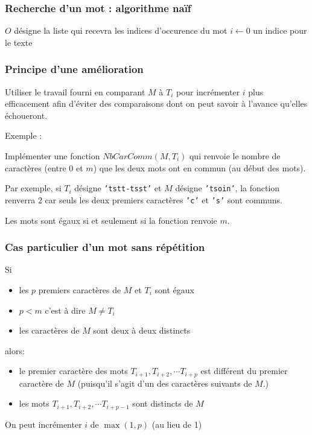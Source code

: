 \begin{frame}
\frametitle{Recherche d'un mot : algorithme naïf}
\begin{algorithm}[H]
  $O$ désigne la liste qui recevra les indices d'occurence du mot\;
  $i\leftarrow 0$ un indice pour le texte \;
  \caption{}
\end{algorithm}
\end{frame}

\begin{frame}
  \frametitle{Principe d'une amélioration}
\begin{center}
  \item Utiliser le travail fourni en comparant $M$ à $T_i$ pour incrémenter $i$ plus efficacement afin d'éviter des comparaisons dont on peut savoir à l'avance qu'elles échoueront. 
\end{center}

Exemple :

Implémenter une fonction $NbCarComm(M,T_i)$ qui renvoie le nombre de caractères (entre 0 et $m$) que les deux mots ont en commun (au début des mots).

Par exemple, si $T_i$ désigne \texttt{'tstt-tsst'} et $M$ désigne \texttt{'tsoin'}, la fonction renverra $2$ car seuls les deux premiers caractères \texttt{'c'} et \texttt{'s'} sont communs.

Les mots sont égaux si et seulement si la fonction renvoie $m$.
\end{frame}

\begin{frame}
  \frametitle{Cas particulier d'un mot sans répétition}
Si
\begin{itemize}
  \item les $p$ premiers caractères de $M$ et $T_i$ sont égaux
  \item $p<m$ c'est à dire $M\neq T_i$
  \item les caractères de $M$ sont deux à deux distincts
\end{itemize}
alors:
\begin{itemize}
  \item le premier caractère des mots $T_{i+1}, T_{i+2},\cdots T_{i+p}$ est différent du premier caractère de $M$ (puisqu'il s'agit d'un des caractères suivants de $M$.)
  \item les mots $T_{i+1}, T_{i+2},\cdots T_{i+p-1}$ sont distincts de $M$
\end{itemize}
On peut incrémenter $i$ de $\max(1,p)$ (au lieu de 1)
\end{frame}

